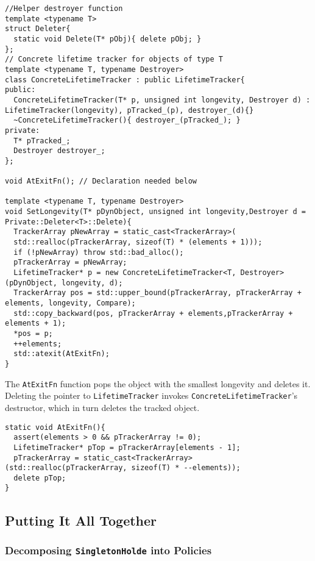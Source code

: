 \begin{verbatim}
//Helper destroyer function
template <typename T>
struct Deleter{
  static void Delete(T* pObj){ delete pObj; }
};
// Concrete lifetime tracker for objects of type T
template <typename T, typename Destroyer>
class ConcreteLifetimeTracker : public LifetimeTracker{
public:
  ConcreteLifetimeTracker(T* p, unsigned int longevity, Destroyer d) : LifetimeTracker(longevity), pTracked_(p), destroyer_(d){}
  ~ConcreteLifetimeTracker(){ destroyer_(pTracked_); }
private:
  T* pTracked_;
  Destroyer destroyer_;
};

void AtExitFn(); // Declaration needed below

template <typename T, typename Destroyer>
void SetLongevity(T* pDynObject, unsigned int longevity,Destroyer d = Private::Deleter<T>::Delete){
  TrackerArray pNewArray = static_cast<TrackerArray>(
  std::realloc(pTrackerArray, sizeof(T) * (elements + 1)));
  if (!pNewArray) throw std::bad_alloc();
  pTrackerArray = pNewArray;
  LifetimeTracker* p = new ConcreteLifetimeTracker<T, Destroyer>(pDynObject, longevity, d);
  TrackerArray pos = std::upper_bound(pTrackerArray, pTrackerArray + elements, longevity, Compare);
  std::copy_backward(pos, pTrackerArray + elements,pTrackerArray + elements + 1);
  *pos = p;
  ++elements;
  std::atexit(AtExitFn);
}
\end{verbatim}

The \texttt{AtExitFn} function pops the object with the smallest
longevity and deletes it. Deleting the pointer to
\texttt{LifetimeTracker} invokes \texttt{ConcreteLifetimeTracker}'s
destructor, which in turn deletes the tracked object.
\begin{verbatim}
static void AtExitFn(){
  assert(elements > 0 && pTrackerArray != 0);
  LifetimeTracker* pTop = pTrackerArray[elements - 1];
  pTrackerArray = static_cast<TrackerArray>(std::realloc(pTrackerArray, sizeof(T) * --elements));
  delete pTop;
}
\end{verbatim}

\subsection{Putting It All Together}

\subsubsection{Decomposing \texttt{SingletonHolde} into Policies}

